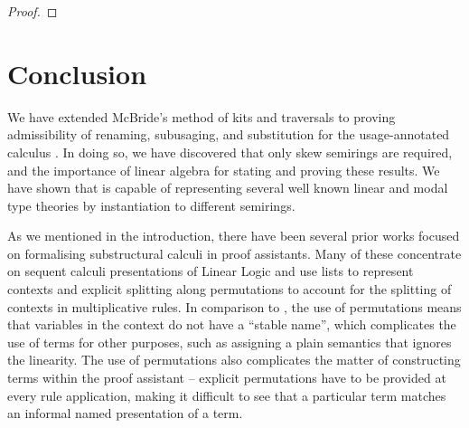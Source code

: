 \documentclass[submission,copyright,creativecommons]{eptcs}
\begin{document}
\begin{proof}
%
\end{proof}

\section{Conclusion}\label{sec:conclusion}

We have extended McBride's method of kits and traversals to proving
admissibility of renaming, subusaging, and substitution for the
usage-annotated calculus \name{}. In doing so, we have discovered that
only skew semirings are required, and the importance of linear algebra
for stating and proving these results.
We have shown that \name{} is capable of representing several well known
linear and modal type theories by instantiation to different semirings.


As we mentioned in the introduction, there have been several prior
works focused on formalising substructural calculi in proof
assistants. Many of these \cite{power99,XavierORN18,laurent18}
concentrate on sequent calculi presentations of Linear Logic and use
lists to represent contexts and explicit splitting along permutations
to account for the splitting of contexts in multiplicative rules. In
comparison to \name{}, the use of permutations means that variables in
the context do not have a ``stable name'', which complicates the use
of terms for other purposes, such as assigning a plain semantics that
ignores the linearity. The use of permutations also complicates the
matter of constructing terms within the proof assistant -- explicit
permutations have to be provided at every rule application, making it
difficult to see that a particular term matches an informal named
presentation of a term.
\end{document}
